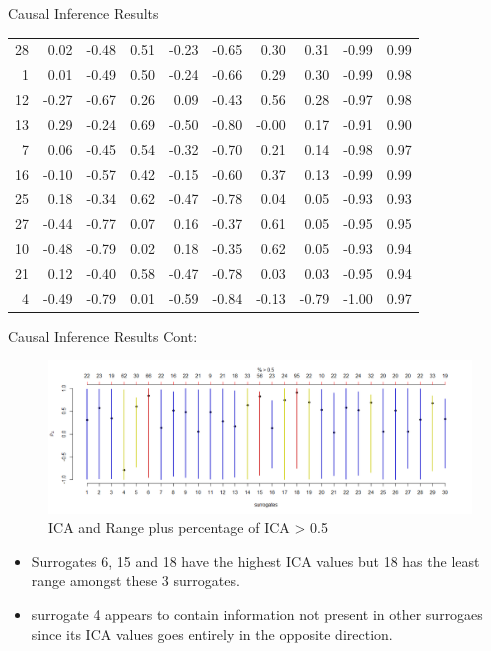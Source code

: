 \documentclass[a4paper,9pt]{beamer}\usepackage[]{graphicx}\usepackage[]{color}
\begin{document}
\begin{frame}{Causal Inference Results}
\begin{table}[H]
\begin{tabular}{rrrrrrrrrr}
   28 & 0.02 & -0.48 & 0.51 & -0.23 & -0.65 & 0.30 & 0.31 & -0.99 & 0.99 \\ 
    1 & 0.01 & -0.49 & 0.50 & -0.24 & -0.66 & 0.29 & 0.30 & -0.99 & 0.98 \\ 
   12 & -0.27 & -0.67 & 0.26 & 0.09 & -0.43 & 0.56 & 0.28 & -0.97 & 0.98 \\ 
   13 & 0.29 & -0.24 & 0.69 & -0.50 & -0.80 & -0.00 & 0.17 & -0.91 & 0.90 \\ 
    7 & 0.06 & -0.45 & 0.54 & -0.32 & -0.70 & 0.21 & 0.14 & -0.98 & 0.97 \\ 
   16 & -0.10 & -0.57 & 0.42 & -0.15 & -0.60 & 0.37 & 0.13 & -0.99 & 0.99 \\ 
   25 & 0.18 & -0.34 & 0.62 & -0.47 & -0.78 & 0.04 & 0.05 & -0.93 & 0.93 \\ 
   27 & -0.44 & -0.77 & 0.07 & 0.16 & -0.37 & 0.61 & 0.05 & -0.95 & 0.95 \\ 
   10 & -0.48 & -0.79 & 0.02 & 0.18 & -0.35 & 0.62 & 0.05 & -0.93 & 0.94 \\ 
   21 & 0.12 & -0.40 & 0.58 & -0.47 & -0.78 & 0.03 & 0.03 & -0.95 & 0.94 \\ 
    \alert{4} & -0.49 & -0.79 & 0.01 & -0.59 & -0.84 & -0.13 & -0.79 & -1.00 & 0.97 \\ 
   \hline
\end{tabular}
\end{table}

\end{frame}

\begin{frame}{Causal Inference Results Cont:}
\begin{figure}[H]
\includegraphics[scale=0.35]{icaplotRange.png}
\caption{\tiny ICA and Range plus percentage of ICA > 0.5}
\end{figure}
\tiny
\begin{itemize}
\item Surrogates 6, 15 and 18 have the highest ICA values but 18 has the least range amongst these 3 surrogates.
\item surrogate 4 appears to contain information not present in other surrogaes since its ICA values goes entirely in the opposite direction. 
\end{itemize}
\end{frame}
\end{document}
